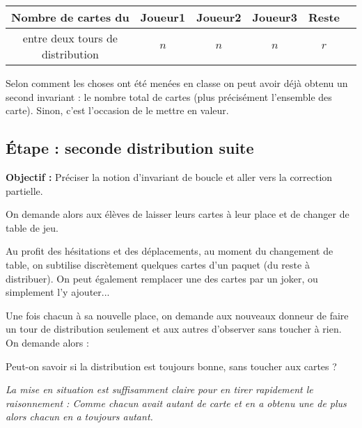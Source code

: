 \begin{exemple}[title = Au tableau]{}{}
\begin{center}
\begin{tabular}{c|c|c|c|c|c|}
\cline{2-5}
\bfseries Nombre de cartes du     & Joueur1 & Joueur2 & Joueur3 & Reste \\
\hline
entre deux tours de distribution   & $n$ & $n$ & $n$ &  $r$  \\

\end{tabular}
\end{center}
\end{exemple}

Selon comment les choses ont été menées en classe on peut avoir déjà obtenu un second invariant : le nombre total de cartes (plus précisément l'ensemble des carte). Sinon, c'est l'occasion de le mettre en valeur.

\subsection{Étape  : seconde distribution suite}

{\bfseries Objectif :} Préciser la notion d'invariant de boucle et aller vers la correction partielle.

\medskip

On demande alors aux élèves de laisser leurs cartes à leur place et de changer de table de jeu.

Au profit des hésitations et des déplacements, au moment du changement de table, on subtilise discrètement quelques cartes d'un paquet (du reste à distribuer). On peut également remplacer une des cartes par un joker, ou simplement l'y ajouter...

Une fois chacun à sa nouvelle place, on demande aux nouveaux donneur de faire un tour de distribution seulement et aux autres d'observer sans toucher à rien. On demande alors :

\begin{question} Peut-on savoir si la distribution est toujours bonne, sans toucher aux cartes ? \end{question}


{\itshape
\color{red}{Il manque un retour d'expérience ici je pense}
}


\textit{La mise en situation est suffisamment claire pour en tirer rapidement le raisonnement : Comme chacun avait autant de carte et en a obtenu une de plus alors chacun en a toujours autant.}

